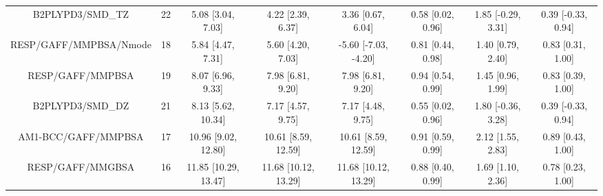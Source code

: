 \documentclass[8pt]{article}
\begin{document}
\begin{center}
\begin{footnotesize}
\begin{longtable}{|cccccccc|}
                   B2PLYPD3/SMD\_TZ &    22 &     5.08 [3.04, 7.03] &     4.22 [2.39, 6.37] &     3.36 [0.67, 6.04] &  0.58 [0.02, 0.96] &   1.85 [-0.29, 3.31] &   0.39 [-0.33, 0.94] \\
             RESP/GAFF/MMPBSA/Nmode &    18 &     5.84 [4.47, 7.31] &     5.60 [4.20, 7.03] &  -5.60 [-7.03, -4.20] &  0.81 [0.44, 0.98] &    1.40 [0.79, 2.40] &    0.83 [0.31, 1.00] \\
                   RESP/GAFF/MMPBSA &    19 &     8.07 [6.96, 9.33] &     7.98 [6.81, 9.20] &     7.98 [6.81, 9.20] &  0.94 [0.54, 0.99] &    1.45 [0.96, 1.99] &    0.83 [0.39, 1.00] \\
                   B2PLYPD3/SMD\_DZ &    21 &    8.13 [5.62, 10.34] &     7.17 [4.57, 9.75] &     7.17 [4.48, 9.75] &  0.55 [0.02, 0.96] &   1.80 [-0.36, 3.28] &   0.39 [-0.33, 0.94] \\
                AM1-BCC/GAFF/MMPBSA &    17 &   10.96 [9.02, 12.80] &   10.61 [8.59, 12.59] &   10.61 [8.59, 12.59] &  0.91 [0.59, 0.99] &    2.12 [1.55, 2.83] &    0.89 [0.43, 1.00] \\
                   RESP/GAFF/MMGBSA &    16 &  11.85 [10.29, 13.47] &  11.68 [10.12, 13.29] &  11.68 [10.12, 13.29] &  0.88 [0.40, 0.99] &    1.69 [1.10, 2.36] &    0.78 [0.23, 1.00] \\
\end{longtable}
\end{footnotesize}
\end{center}
\end{document}

